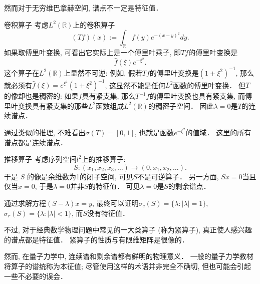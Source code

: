 然而对于无穷维巴拿赫空间, 谱点不一定是特征值．

\begin{example}{卷积算子}
考虑$L^2(\mathbb{R})$上的卷积算子
$$
(Tf)(x):=\int_{\mathbb{R}}f(y)e^{-(x-y)^2}dy.
$$
如果取傅里叶变换, 可看出它实际上是一个傅里叶乘子, 即$Tf$的傅里叶变换是
$$
\hat f(\xi)e^{-\xi^2}.
$$
这个算子在$L^2(\mathbb{R})$上显然不可逆: 例如, 假若$Tf$的傅里叶变换是$(1+\xi^2)^{-1}$, 那么就必须有$\hat f(\xi)=e^{\xi^2}(1+\xi^2)^{-1}$, 这显然不能是任何$L^2$函数的傅里叶变换． 但$T$的像却也是稠密的: 如果$\hat f$具有紧支集, 那么$T^{-1}f$的傅里叶变换也具有紧支集, 而傅里叶变换具有紧支集的那些$L^2$函数组成$L^2(\mathbb{R})$的稠密子空间． 因此$\lambda=0$是$T$的连续谱点．

通过类似的推理, 不难看出$\sigma(T)=[0,1]$, 也就是函数$e^{-\xi^2}$的值域． 这里的所有谱点都是连续谱点．
\end{example}

\begin{example}{推移算子}
考虑序列空间$l^2$上的推移算子:
$$
S:(x_1,x_2,x_3,\dots)\to(0,x_1,x_2,\dots).
$$
于是 $S$ 的像是余维数为1的闭子空间, 可见$S$不是可逆算子． 另一方面, $Sx=0$当且仅当$x=0$, 于是$\lambda=0$并非$S$的特征值． 可见$\lambda=0$是$S$的剩余谱点．

通过求解方程$(S-\lambda)x=y$, 最终可以证明$\sigma_c(S)=\{\lambda:|\lambda|=1\}$, $\sigma_r(S)=\{\lambda:|\lambda|<1\}$, 而$S$没有特征值．
\end{example}

不过, 对于经典数学物理问题中常见的一大类算子 (称为紧算子), 真正使人感兴趣的谱点都是特征值． 紧算子的性质与有限维矩阵是很像的．

然而, 在量子力学中, 连续谱和剩余谱都有鲜明的物理意义． 一般的量子力学教材将算子的谱统称为本征值; 尽管使用这样的术语并非完全不确切, 但也可能会引起一些不必要的误会．
